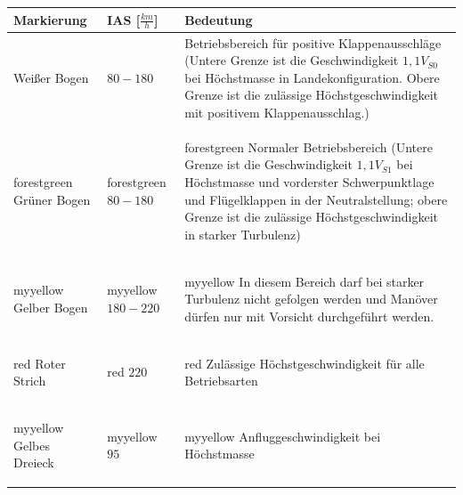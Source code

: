 \begin{tabular}{|m{}|m{}|m{6cm}|}
\hline
Markierung & IAS [$\frac{km}{h}$] & Bedeutung \\
\hline
Weißer Bogen & $80-180$ & Betriebsbereich für positive Klappenausschläge (Untere Grenze ist die Geschwindigkeit $1,1 V_{S0}$ bei Höchstmasse in Landekonfiguration. Obere Grenze ist die zulässige Höchstgeschwindigkeit mit positivem Klappenausschlag.)\\
\hline
\begin{color}{forestgreen} Grüner Bogen \end{color} & \begin{color}{forestgreen} $80-180$ \end{color} & \begin{color}{forestgreen} Normaler Betriebsbereich (Untere Grenze ist die Geschwindigkeit $1,1 V_{S1}$ bei Höchstmasse und vorderster Schwerpunktlage und Flügelklappen in der Neutralstellung; obere Grenze ist die zulässige Höchstgeschwindigkeit in starker Turbulenz) \end{color} \\ 
\hline
\begin{color}{myyellow} Gelber Bogen \end{color} & \begin{color}{myyellow} $180-220$ \end{color} & \begin{color}{myyellow} In diesem Bereich darf bei starker Turbulenz nicht gefolgen werden und Manöver dürfen nur mit Vorsicht durchgeführt werden. \end{color}\\
\hline
\begin{color}{red} Roter Strich \end{color} & \begin{color}{red} $220$ \end{color} & \begin{color}{red} Zulässige Höchstgeschwindigkeit für alle Betriebsarten \end{color}\\
\hline
\begin{color}{myyellow} Gelbes Dreieck \end{color} & \begin{color}{myyellow} $95$ \end{color} & \begin{color}{myyellow} Anfluggeschwindigkeit bei Höchstmasse \end{color}\\
\hline
\end{tabular}
\newline


